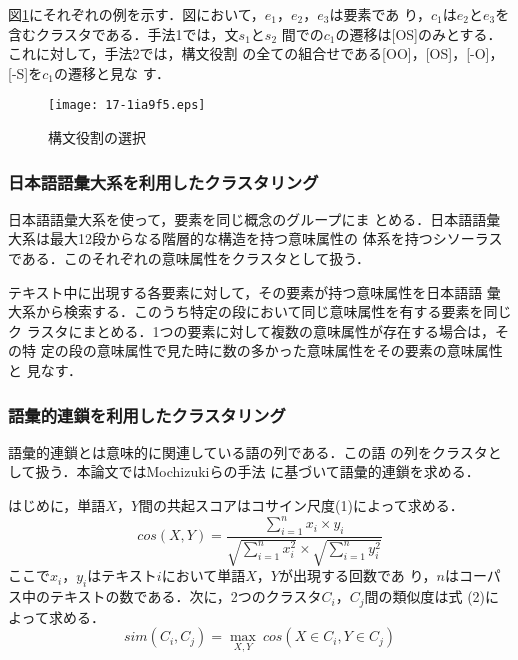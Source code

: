 \documentclass[japanese]{jnlp_1.4}
\begin{document}
  図\ref{select}にそれぞれの例を示す．図において，$e_1$，$e_2$，$e_3$は要素であ
  り，$c_1$は$e_2$と$e_3$を含むクラスタである．手法1では，文$s_1$と$s_2$
  間での$c_1$の遷移は[OS]のみとする．これに対して，手法2では，構文役割
  の全ての組合せである[OO]，[OS]，[-O]，[-S]を$c_1$の遷移と見な
  す．

  \begin{figure}[t]
   \begin{center}
\texttt{[image: 17-1ia9f5.eps]}
   \end{center}
     \caption{構文役割の選択}
\label{select}
  \end{figure}


   \subsubsection{日本語語彙大系を利用したクラスタリング}

   日本語語彙大系を使って，要素を同じ概念のグループにま
   とめる．日本語語彙大系は最大12段からなる階層的な構造を持つ意味属性の
   体系を持つシソーラスである．このそれぞれの意味属性をクラスタとして扱う．

   テキスト中に出現する各要素に対して，その要素が持つ意味属性を日本語語
   彙大系から検索する．このうち特定の段において同じ意味属性を有する要素を同じク
   ラスタにまとめる．1つの要素に対して複数の意味属性が存在する場合は，その特
   定の段の意味属性で見た時に数の多かった意味属性をその要素の意味属性と
   見なす．

   \subsubsection{語彙的連鎖を利用したクラスタリング}

   語彙的連鎖\cite{morris1991}とは意味的に関連している語の列である．この語
   の列をクラスタとして扱う．本論文ではMochizukiらの手法
   \cite{mochizuki2000}に基づいて語彙的連鎖を求める．

   はじめに，単語$X$，$Y$間の共起スコアはコサイン尺度(1)によって求める．
   \begin{equation}
    cos(X,Y)=\frac{\sum^n_{i=1}x_i\times y_i}{\sqrt{\sum^n_{i=1}x^2_i}
    \times \sqrt{\sum^n_{i=1}y^2_i}}
   \end{equation}
   ここで$x_i$，$y_i$はテキスト$i$において単語$X$，$Y$が出現する回数であ
   り，$n$はコーパス中のテキストの数である．次に，2つのクラスタ$C_i$，$C_j$間の類似度は式
   (2)によって求める．
   \begin{equation}
    sim(C_i,C_j)= \underset{X,Y}{\max}\ cos(X \in C_i, Y \in C_j)
   \end{equation}
   
\end{document}
